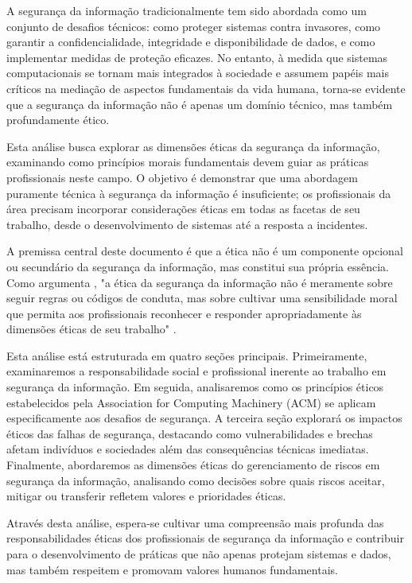 
A segurança da informação tradicionalmente tem sido abordada como um conjunto de desafios técnicos: como proteger sistemas contra invasores, como garantir a confidencialidade, integridade e disponibilidade de dados, e como implementar medidas de proteção eficazes. No entanto, à medida que sistemas computacionais se tornam mais integrados à sociedade e assumem papéis mais críticos na mediação de aspectos fundamentais da vida humana, torna-se evidente que a segurança da informação não é apenas um domínio técnico, mas também profundamente ético.

Esta análise busca explorar as dimensões éticas da segurança da informação, examinando como princípios morais fundamentais devem guiar as práticas profissionais neste campo. O objetivo é demonstrar que uma abordagem puramente técnica à segurança da informação é insuficiente; os profissionais da área precisam incorporar considerações éticas em todas as facetas de seu trabalho, desde o desenvolvimento de sistemas até a resposta a incidentes.

A premissa central deste documento é que a ética não é um componente opcional ou secundário da segurança da informação, mas constitui sua própria essência. Como argumenta \citeauthor{spinello2013cyberethics}, "a ética da segurança da informação não é meramente sobre seguir regras ou códigos de conduta, mas sobre cultivar uma sensibilidade moral que permita aos profissionais reconhecer e responder apropriadamente às dimensões éticas de seu trabalho" \cite{spinello2013cyberethics}.

Esta análise está estruturada em quatro seções principais. Primeiramente, examinaremos a responsabilidade social e profissional inerente ao trabalho em segurança da informação. Em seguida, analisaremos como os princípios éticos estabelecidos pela Association for Computing Machinery (ACM) se aplicam especificamente aos desafios de segurança. A terceira seção explorará os impactos éticos das falhas de segurança, destacando como vulnerabilidades e brechas afetam indivíduos e sociedades além das consequências técnicas imediatas. Finalmente, abordaremos as dimensões éticas do gerenciamento de riscos em segurança da informação, analisando como decisões sobre quais riscos aceitar, mitigar ou transferir refletem valores e prioridades éticas.

Através desta análise, espera-se cultivar uma compreensão mais profunda das responsabilidades éticas dos profissionais de segurança da informação e contribuir para o desenvolvimento de práticas que não apenas protejam sistemas e dados, mas também respeitem e promovam valores humanos fundamentais. 